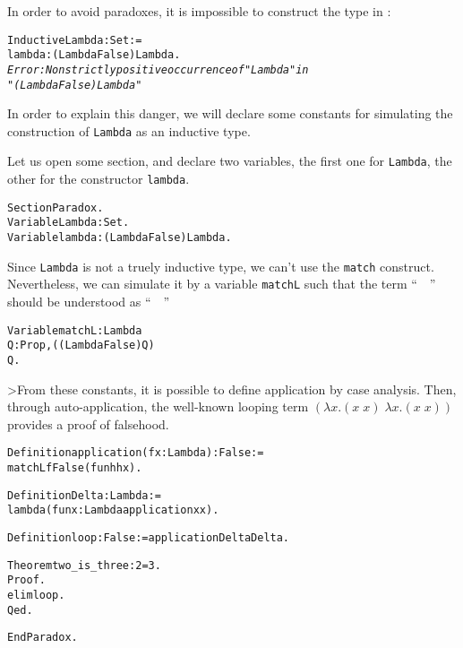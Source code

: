 \documentclass[11pt]{article}
\begin{document}
In order to avoid paradoxes, it is impossible to construct
the type  in {\coq}:

\begin{alltt}
Inductive Lambda : Set :=
  lambda : (Lambda {\arrow} False) {\arrow} Lambda. 
\it
Error: Non strictly positive occurrence of "Lambda" in
 "(Lambda {\arrow} False) {\arrow} Lambda"
\end{alltt}

In order to explain this danger, we
will declare some constants for simulating the construction of 
\texttt{Lambda} as an inductive type.

Let us open some section, and declare two variables, the first one for
\texttt{Lambda}, the other for the constructor \texttt{lambda}.

\begin{alltt}
Section Paradox.
Variable Lambda : Set.
Variable lambda : (Lambda {\arrow} False) {\arrow}Lambda.
\end{alltt}

Since \texttt{Lambda} is not a truely inductive type, we can't use
the \texttt{match} construct. Nevertheless, we can simulate it by a
variable \texttt{matchL} such that the term 
``~~''
should be understood  as 
``~~''


\begin{alltt}
Variable matchL : Lambda {\arrow} 
                  {\prodsym} Q:Prop, ((Lambda {\arrow}False) {\arrow} Q) {\arrow}
                  Q.
\end{alltt}

>From these constants, it is possible to define application by case
analysis. Then, through auto-application, the well-known looping term
$(\lambda x.(x\;x)\;\lambda x.(x\;x))$ provides a proof of falsehood.

\begin{alltt}
Definition application (f x: Lambda) :False :=
  matchL f False (fun h {\funarrow} h x).

Definition Delta :  Lambda := 
  lambda (fun x : Lambda {\funarrow} application x x).

Definition loop : False := application Delta Delta.

Theorem two_is_three : 2 = 3.
Proof.
 elim loop.
Qed.

End Paradox.
\end{alltt}
\end{document}

